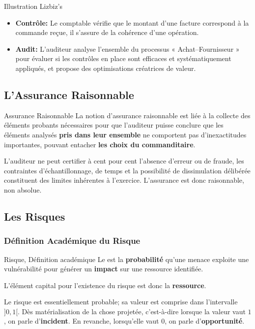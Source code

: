 \begin{boxlizbiz}{Illustration Lizbiz's}
\begin{itemize}
  \item \textbf{Contrôle:} Le comptable vérifie que le montant d'une facture
    correspond à la commande reçue, il s'assure de la cohérence d'une opération.
  \item \textbf{Audit:} L'auditeur analyse l'ensemble du processus
    « Achat–Fournisseur » pour évaluer si les contrôles en place sont efficaces et
    systématiquement appliqués, et propose des optimisations créatrices de valeur.
\end{itemize}
\end{boxlizbiz}

\subsection{L'Assurance Raisonnable}

\begin{boxdef}{Assurance Raisonnable}
La notion d'assurance raisonnable est liée à la collecte des éléments probants
nécessaires pour que l'auditeur puisse conclure que les éléments analysés
\textbf{pris dans leur ensemble} ne comportent pas d'inexactitudes importantes,
pouvant entacher \textbf{les choix du commanditaire}.
\end{boxdef}

L'auditeur ne peut certifier à cent pour cent l'absence d'erreur ou de fraude, les
contraintes d'échantillonnage, de temps et la possibilité de dissimulation délibérée
constituent des limites inhérentes à l'exercice. L'assurance est donc raisonnable,
non absolue.

\subsection{Les Risques}
\label{subsec:Risques}

\subsubsection{Définition Académique du Risque}

\begin{boxdef}{Risque, Définition académique}
Le  est la \textbf{probabilité} qu'une menace exploite une
vulnérabilité pour générer un \textbf{impact} sur une ressource identifiée.

L'élément capital pour l'existence du risque est donc la \textbf{ressource}.

Le risque est essentiellement probable; sa valeur est comprise dans l'intervalle
$]0,1[$. Dès matérialisation de la chose projetée, c'est-à-dire lorsque la valeur
vaut $1$, on parle d'\textbf{incident}. En revanche, lorsqu'elle vaut $0$, on parle
d'\textbf{opportunité}.
\end{boxdef}

